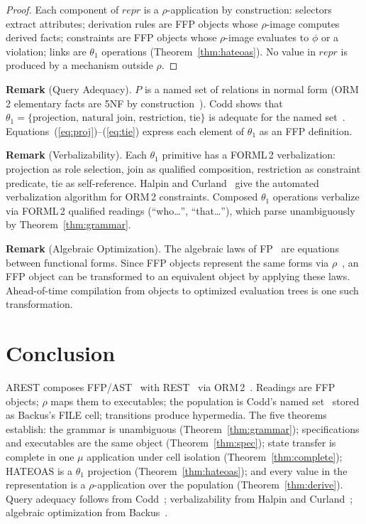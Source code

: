 \documentclass[acmsmall,screen,review]{acmart}
\begin{document}
\begin{proof}
Each component of $\mathit{repr}$ is a $\rho$-application by construction: selectors extract attributes; derivation rules are FFP objects whose $\rho$-image computes derived facts; constraints are FFP objects whose $\rho$-image evaluates to $\phi$ or a violation; links are $\theta_1$ operations (Theorem~\ref{thm:hateoas}). No value in $\mathit{repr}$ is produced by a mechanism outside $\rho$.
\end{proof}

\medskip
\noindent\textbf{Remark} (Query Adequacy). $P$ is a named set of relations in normal form (ORM\,2 elementary facts are 5NF by construction~\cite[Ch.\,12]{halpin08}). Codd shows that $\theta_1 = \{\text{projection, natural join, restriction, tie}\}$ is adequate for the named set~\cite{codd72}. Equations~(\ref{eq:proj})--(\ref{eq:tie}) express each element of $\theta_1$ as an FFP definition.

\medskip
\noindent\textbf{Remark} (Verbalizability). Each $\theta_1$ primitive has a FORML\,2 verbalization: projection as role selection, join as qualified composition, restriction as constraint predicate, tie as self-reference. Halpin and Curland~\cite{halpin06} give the automated verbalization algorithm for ORM\,2 constraints. Composed $\theta_1$ operations verbalize via FORML\,2 qualified readings (``who\ldots'', ``that\ldots''), which parse unambiguously by Theorem~\ref{thm:grammar}.

\medskip
\noindent\textbf{Remark} (Algebraic Optimization). The algebraic laws of FP~\cite[Sec.\,12.2]{backus78} are equations between functional forms. Since FFP objects represent the same forms via $\rho$~\cite[Sec.\,13.3.2]{backus78}, an FFP object can be transformed to an equivalent object by applying these laws. Ahead-of-time compilation from objects to optimized evaluation trees is one such transformation.

\section{Conclusion}

AREST composes FFP/AST~\cite{backus78} with REST~\cite{fielding00} via ORM\,2~\cite{halpin08}. Readings are FFP objects; $\rho$ maps them to executables; the population is Codd's named set~\cite{codd70} stored as Backus's FILE cell; transitions produce hypermedia. The five theorems establish: the grammar is unambiguous (Theorem~\ref{thm:grammar}); specifications and executables are the same object (Theorem~\ref{thm:spec}); state transfer is complete in one $\mu$ application under cell isolation (Theorem~\ref{thm:complete}); HATEOAS is a $\theta_1$ projection (Theorem~\ref{thm:hateoas}); and every value in the representation is a $\rho$-application over the population (Theorem~\ref{thm:derive}). Query adequacy follows from Codd~\cite{codd72}; verbalizability from Halpin and Curland~\cite{halpin06}; algebraic optimization from Backus~\cite[Sec.\,12.2]{backus78}.
\end{document}
